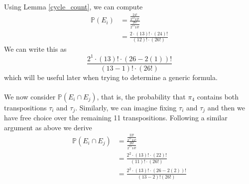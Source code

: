 \noindent Using Lemma \ref{cycle_count}, we can compute
\begin{align*}
  \mathbb{P}(E_i) & = \frac{\frac{24!}{2^{12}12!}}{\frac{26!}{2^{13}13!}} \\
  & =  \frac{2\cdot(13)!\cdot(24)!}{(12)!\cdot(26!)}
\end{align*}
We can write this as
\[
  \frac{2^1\cdot(13)!\cdot(26-2(1))!}{(13-1)!\cdot(26!)}
\]
which will be useful later when trying to determine a generic formula.
\\\\We now consider $\mathbb{P}(E_i\cap E_j)$, that is, the
probability that $\pi_4$ contains both transpositions $\tau_i$ and
$\tau_j$. Similarly, we can imagine fixing $\tau_i$ and $\tau_j$ and
then we have free choice over the remaining 11 transpositions.
Following a similar argument as above we derive
\begin{align*}
  \mathbb{P}(E_i\cap E_j) & =
  \frac{\frac{22!}{2^{11}11!}}{\frac{26!}{2^{13}13!}}
  \\
  & =  \frac{2^2\cdot(13)!\cdot(22)!}{(11)!\cdot(26!)}  \\
  & = \frac{2^2\cdot(13)!\cdot(26-2(2))!}{(13-2)!(26!)}
\end{align*}
